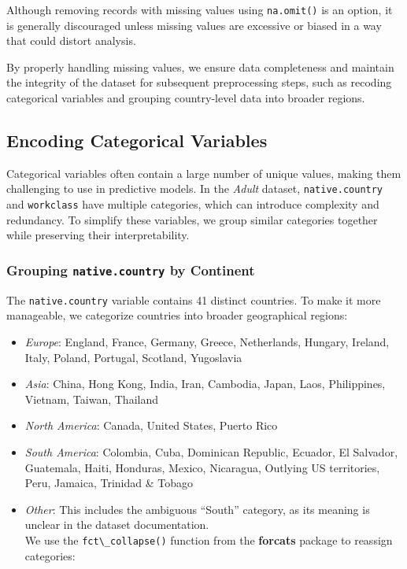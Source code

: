 \documentclass[
  11pt,
]{book}
\newcommand{\passthrough}[1]{#1}
\providecommand{\tightlist}{%
  \setlength{\itemsep}{0pt}\setlength{\parskip}{0pt}}
\theoremstyle{definition}
\theoremstyle{definition}
\theoremstyle{definition}
\theoremstyle{definition}
\theoremstyle{remark}
\begin{document}
Although removing records with missing values using \passthrough{\lstinline!na.omit()!} is an option, it is generally discouraged unless missing values are excessive or biased in a way that could distort analysis.

By properly handling missing values, we ensure data completeness and maintain the integrity of the dataset for subsequent preprocessing steps, such as recoding categorical variables and grouping country-level data into broader regions.

\subsection{Encoding Categorical Variables}\label{encoding-categorical-variables}

Categorical variables often contain a large number of unique values, making them challenging to use in predictive models. In the \emph{Adult} dataset, \passthrough{\lstinline!native.country!} and \passthrough{\lstinline!workclass!} have multiple categories, which can introduce complexity and redundancy. To simplify these variables, we group similar categories together while preserving their interpretability.

\subsubsection*{\texorpdfstring{Grouping \texttt{native.country} by Continent}{Grouping native.country by Continent}}\label{grouping-native.country-by-continent}


The \passthrough{\lstinline!native.country!} variable contains 41 distinct countries. To make it more manageable, we categorize countries into broader geographical regions:

\begin{itemize}
\tightlist
\item
  \emph{Europe}: England, France, Germany, Greece, Netherlands, Hungary, Ireland, Italy, Poland, Portugal, Scotland, Yugoslavia\\
\item
  \emph{Asia}: China, Hong Kong, India, Iran, Cambodia, Japan, Laos, Philippines, Vietnam, Taiwan, Thailand\\
\item
  \emph{North America}: Canada, United States, Puerto Rico\\
\item
  \emph{South America}: Colombia, Cuba, Dominican Republic, Ecuador, El Salvador, Guatemala, Haiti, Honduras, Mexico, Nicaragua, Outlying US territories, Peru, Jamaica, Trinidad \& Tobago\\
\item
  \emph{Other}: This includes the ambiguous ``South'' category, as its meaning is unclear in the dataset documentation.\\
  We use the \passthrough{\lstinline!fct\_collapse()!} function from the \textbf{forcats} package to reassign categories:
\end{itemize}
\end{document}
